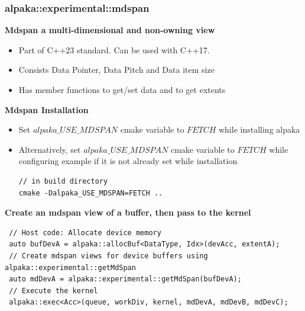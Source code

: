\documentclass[9pt]{beamer}
\begin{document}
\begin{frame}[fragile]
\small
\frametitle{alpaka::experimental::mdspan}
\textbf{Mdspan a multi-dimensional and non-owning view}
\begin{itemize}
\item Part of C++23 standard. Can be used with C++17.
\item Consists Data Pointer, Data Pitch and Data item size
\item Has member functions to get/set data and to get extents
 \end{itemize}
 \textbf{Mdspan Installation}
 \begin{itemize}
\item Set $alpaka\_USE\_MDSPAN$ cmake variable to $FETCH$ while installing alpaka
\item Alternatively, set $alpaka\_USE\_MDSPAN$ cmake variable to $FETCH$ while configuring example if it is not already set while installation
\begin{lstlisting}
// in build directory
cmake -Dalpaka_USE_MDSPAN=FETCH ..
 \end{lstlisting}
\end{itemize}
\textbf{Create an mdspan view of a buffer, then pass to the kernel}
\lstset{basicstyle=\ttfamily\scriptsize}
\begin{lstlisting}
 // Host code: Allocate device memory
 auto bufDevA = alpaka::allocBuf<DataType, Idx>(devAcc, extentA);
 // Create mdspan views for device buffers using alpaka::experimental::getMdSpan
 auto mdDevA = alpaka::experimental::getMdSpan(bufDevA);
 // Execute the kernel
 alpaka::exec<Acc>(queue, workDiv, kernel, mdDevA, mdDevB, mdDevC);
 \end{lstlisting}
 \end{frame}
\end{document}
